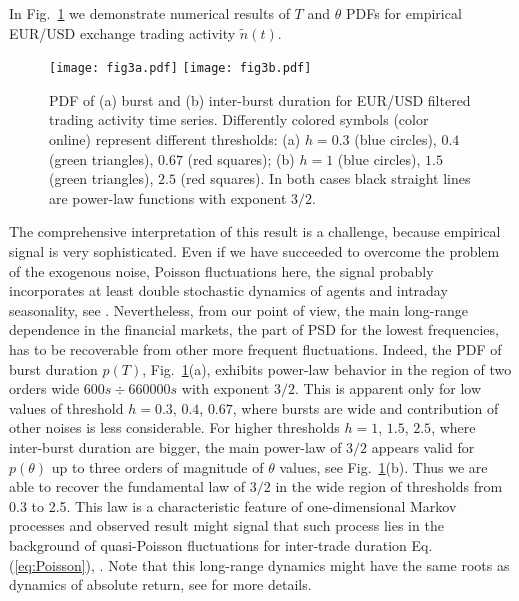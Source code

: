 \documentclass{article}
\newcommand\figref[1]{Fig.~\ref{#1}}
\begin{document}
In \figref{fig3} we demonstrate numerical results of $T$ and $\theta$ PDFs for empirical EUR/USD exchange trading activity $\tilde{n}(t)$.

\begin{figure}[h]
\centering
\texttt{[image: fig3a.pdf]}
\texttt{[image: fig3b.pdf]}
\caption{\label{fig3} PDF of (a) burst and (b) inter-burst duration for EUR/USD filtered trading activity time series. Differently colored symbols (color online) represent different thresholds: (a) $h=0.3$ (blue circles), $0.4$ (green triangles), $0.67$ (red squares); (b) $h=1$ (blue circles), $1.5$ (green triangles), $2.5$ (red squares). In both cases black straight lines are power-law functions with exponent $3/2$.}
\end{figure}

The comprehensive interpretation of this result is a challenge, because empirical signal is very sophisticated. Even if we have succeeded to overcome the problem of the exogenous noise, Poisson fluctuations here, the signal probably incorporates at least double stochastic dynamics of agents and intraday seasonality, see \cite{Gontis2014PlosOne,Gontis2016PhysA}. Nevertheless,  from our point of view, the main long-range dependence in the financial markets, the part of PSD for the lowest frequencies, has to be recoverable from other more frequent fluctuations. Indeed, the PDF of burst duration $p(T)$, \figref{fig3}(a), exhibits power-law behavior in the region of two orders wide $600s\div6 60000s$ with exponent $3/2$. This is apparent only for low values of threshold  $h=0.3$, $0.4$, $0.67$, where bursts are wide and contribution of other noises is less considerable. For higher thresholds $h=1$, $1.5$, $2.5$, where inter-burst duration are bigger, the main power-law of $3/2$ appears valid for $p(\theta)$ up to three orders of magnitude of $\theta$ values, see \figref{fig3}(b). Thus we are able to recover the fundamental law of $3/2$ in the wide region of thresholds from 0.3 to 2.5. This law is a characteristic feature of one-dimensional Markov processes and observed result might signal that such process lies in the background of quasi-Poisson fluctuations for inter-trade duration Eq.(\ref{eq:Poisson}), \cite{Gontis2007PhysA}. Note that this long-range dynamics might have the same roots as dynamics of absolute return, see \cite{Gontis2014PlosOne} for more details.
\end{document}
